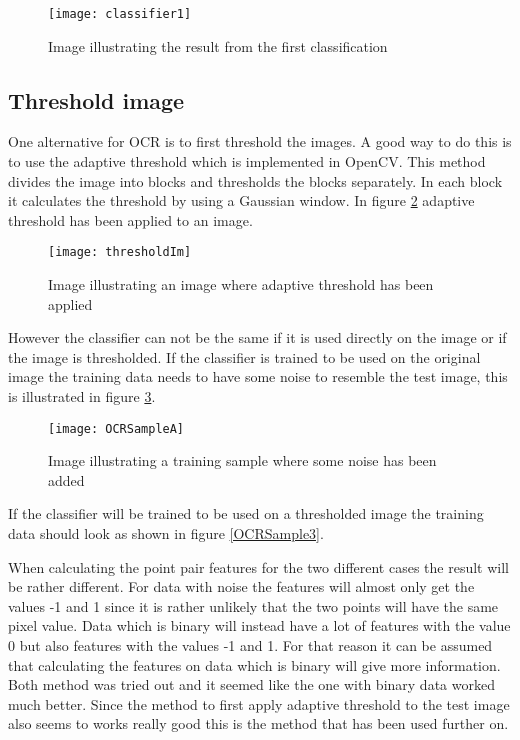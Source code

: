 \begin{figure}[H]
\centering
	\texttt{[image: classifier1]}
	\caption{Image illustrating the result from the first classification}
	\label{classifier1}
\end{figure}

\subsection{Threshold image}
\label{sec:Threshold image}
One alternative for OCR is to first threshold the images. A good way to do this is to use the adaptive threshold which is implemented in OpenCV. This method divides the image into blocks and thresholds the blocks separately. In each block it calculates the threshold by using a Gaussian window. In figure \ref{thresholdIm} adaptive threshold has been applied to an image.

\begin{figure}[H]
\centering
	\texttt{[image: thresholdIm]}
	\caption{Image illustrating an image where adaptive threshold has been applied}
	\label{thresholdIm}
\end{figure}

However the classifier can not be the same if it is used directly on the image or if the image is thresholded. If the classifier is trained to be used on the original image the training data needs to have some noise to resemble the test image, this is illustrated in figure \ref{OCRSampleA}.  

\begin{figure}[H]
\centering
	\texttt{[image: OCRSampleA]}
	\caption{Image illustrating a training sample where some noise has been added}
	\label{OCRSampleA}
\end{figure}
 
If the classifier will be trained to be used on a thresholded image the training data should look as shown in figure \ref{OCRSample3}.

When calculating the point pair features for the two different cases the result will be rather different. For data with noise the features will almost only get the values -1 and 1 since it is rather unlikely that the two points will have the same pixel value. Data which is binary will instead have a lot of features with the value 0 but also features with the values -1 and 1. For that reason it can be assumed that calculating the features on data which is binary will give more information. Both method was tried out and it seemed like the one with binary data worked much better. Since the method to first apply adaptive threshold to the test image also seems to works really good this is the method that has been used further on.
   
